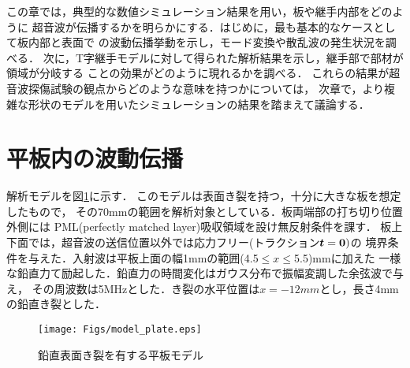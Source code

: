 この章では，典型的な数値シミュレーション結果を用い，板や継手内部をどのように
超音波が伝播するかを明らかにする．はじめに，最も基本的なケースとして板内部と表面で
の波動伝播挙動を示し，モード変換や散乱波の発生状況を調べる．
次に，T字継手モデルに対して得られた解析結果を示し，継手部で部材が領域が分岐する
ことの効果がどのように現れるかを調べる．
これらの結果が超音波探傷試験の観点からどのような意味を持つかについては，
次章で，より複雑な形状のモデルを用いたシミュレーションの結果を踏まえて議論する．
\section{平板内の波動伝播}
解析モデルを図\ref{fig:fig3_00}に示す．
このモデルは表面き裂を持つ，十分に大きな板を想定したもので，
その70mmの範囲を解析対象としている．板両端部の打ち切り位置外側には
PML(perfectly matched layer)吸収領域を設け無反射条件を課す．
板上下面では，超音波の送信位置以外では応力フリー(トラクション$\mbox{\boldmath $t$}=\mbox{\boldmath $0$})$の
境界条件を与えた．入射波は平板上面の幅1mmの範囲(4.5$\leq x \leq $5.5)mmに加えた
一様な鉛直力て励起した．鉛直力の時間変化はガウス分布で振幅変調した余弦波で与え，
その周波数は5MHzとした．き裂の水平位置は$x=-12mm$とし，長さ4mmの鉛直き裂とした．
\begin{figure}[h]
	\begin{center}
	\texttt{[image: Figs/model\_plate.eps]} 
	\end{center}
	\caption{
		鉛直表面き裂を有する平板モデル
	} 
	\label{fig:fig3_00}
\end{figure}

